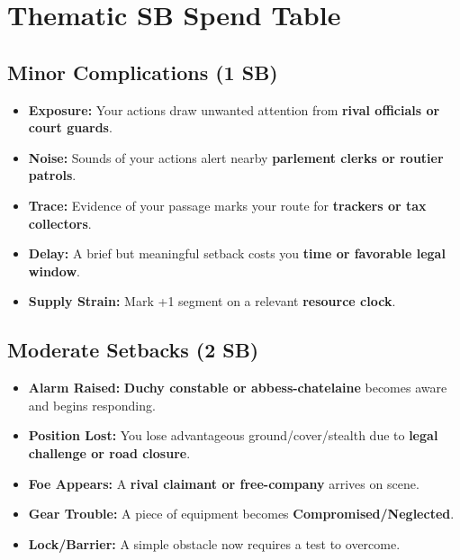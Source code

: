 
\section*{Thematic SB Spend Table}
\label{sec:vhasia-sb}

\subsection*{Minor Complications (1 SB)}
\begin{itemize}
\item \textbf{Exposure:} Your actions draw unwanted attention from \textbf{rival officials or court guards}.
\item \textbf{Noise:} Sounds of your actions alert nearby \textbf{parlement clerks or routier patrols}.
\item \textbf{Trace:} Evidence of your passage marks your route for \textbf{trackers or tax collectors}.
\item \textbf{Delay:} A brief but meaningful setback costs you \textbf{time or favorable legal window}.
\item \textbf{Supply Strain:} Mark +1 segment on a relevant \textbf{resource clock}.
\end{itemize}

\subsection*{Moderate Setbacks (2 SB)}
\begin{itemize}
\item \textbf{Alarm Raised:} \textbf{Duchy constable or abbess-chatelaine} becomes aware and begins responding.
\item \textbf{Position Lost:} You lose advantageous ground/cover/stealth due to \textbf{legal challenge or road closure}.
\item \textbf{Foe Appears:} A \textbf{rival claimant or free-company} arrives on scene.
\item \textbf{Gear Trouble:} A piece of equipment becomes \textbf{Compromised/Neglected}.
\item \textbf{Lock/Barrier:} A simple obstacle now requires a test to overcome.
\end{itemize}

